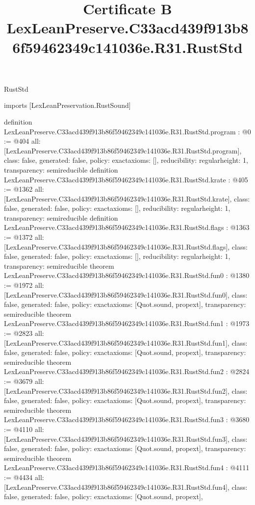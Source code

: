 \begin{lexlean}{RustStd}
\title{Certificate B LexLeanPreserve.C33acd439f913b86f59462349c141036e.R31.RustStd}
\begin{coremodule}
imports [LexLeanPreservation.RustSound]

definition LexLeanPreserve.C33acd439f913b86f59462349c141036e.R31.RustStd.program : @0 := @404 {
  all: [LexLeanPreserve.C33acd439f913b86f59462349c141036e.R31.RustStd.program],
  class: false,
  generated: false,
  policy: exact{axioms: []},
  reducibility: regular{height: 1},
  transparency: semireducible
}
definition LexLeanPreserve.C33acd439f913b86f59462349c141036e.R31.RustStd.krate : @405 := @1362 {
  all: [LexLeanPreserve.C33acd439f913b86f59462349c141036e.R31.RustStd.krate],
  class: false,
  generated: false,
  policy: exact{axioms: []},
  reducibility: regular{height: 1},
  transparency: semireducible
}
definition LexLeanPreserve.C33acd439f913b86f59462349c141036e.R31.RustStd.flags : @1363 := @1372 {
  all: [LexLeanPreserve.C33acd439f913b86f59462349c141036e.R31.RustStd.flags],
  class: false,
  generated: false,
  policy: exact{axioms: []},
  reducibility: regular{height: 1},
  transparency: semireducible
}
theorem LexLeanPreserve.C33acd439f913b86f59462349c141036e.R31.RustStd.fun0 : @1380 := @1972 {
  all: [LexLeanPreserve.C33acd439f913b86f59462349c141036e.R31.RustStd.fun0],
  class: false,
  generated: false,
  policy: exact{axioms: [Quot.sound, propext]},
  transparency: semireducible
}
theorem LexLeanPreserve.C33acd439f913b86f59462349c141036e.R31.RustStd.fun1 : @1973 := @2823 {
  all: [LexLeanPreserve.C33acd439f913b86f59462349c141036e.R31.RustStd.fun1],
  class: false,
  generated: false,
  policy: exact{axioms: [Quot.sound, propext]},
  transparency: semireducible
}
theorem LexLeanPreserve.C33acd439f913b86f59462349c141036e.R31.RustStd.fun2 : @2824 := @3679 {
  all: [LexLeanPreserve.C33acd439f913b86f59462349c141036e.R31.RustStd.fun2],
  class: false,
  generated: false,
  policy: exact{axioms: [Quot.sound, propext]},
  transparency: semireducible
}
theorem LexLeanPreserve.C33acd439f913b86f59462349c141036e.R31.RustStd.fun3 : @3680 := @4110 {
  all: [LexLeanPreserve.C33acd439f913b86f59462349c141036e.R31.RustStd.fun3],
  class: false,
  generated: false,
  policy: exact{axioms: [Quot.sound, propext]},
  transparency: semireducible
}
theorem LexLeanPreserve.C33acd439f913b86f59462349c141036e.R31.RustStd.fun4 : @4111 := @4434 {
  all: [LexLeanPreserve.C33acd439f913b86f59462349c141036e.R31.RustStd.fun4],
  class: false,
  generated: false,
  policy: exact{axioms: [Quot.sound, propext]},
}
\end{coremodule}
\end{lexlean}
